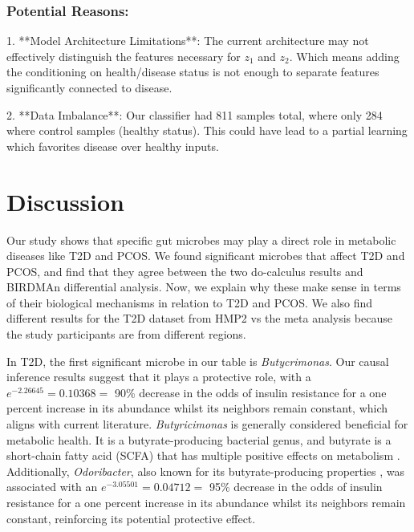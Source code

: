 \documentclass[12pt,letterpaper]{article}
\begin{document}
\subsubsection{Potential Reasons:}

1. **Model Architecture Limitations**: The current architecture may not effectively distinguish the features necessary for \( z_1 \) and \( z_2 \). Which means adding the conditioning on health/disease status is not enough to separate features significantly connected to disease.

2. **Data Imbalance**: Our classifier had 811 samples total, where only 284 where control samples (healthy status). This could have lead to a partial learning which favorites disease over healthy inputs.


\section{Discussion}

Our study shows that specific gut microbes may play a direct role in metabolic diseases like T2D and PCOS. We found significant microbes that affect T2D and PCOS, and find that they agree between the two do-calculus results and BIRDMAn differential analysis. Now, we explain why these make sense in terms of their biological mechanisms in relation to T2D and PCOS. We also find different results for the T2D dataset from HMP2 vs the meta analysis because the study participants are from different regions. 

In T2D, the first significant microbe in our table is \textit{Butycrimonas}. Our causal inference results suggest that it plays a protective role, with a $e^{-2.26645} = 0.10368 =$ 90\% decrease in the odds of insulin resistance for a one percent increase in its abundance whilst its neighbors remain constant, which aligns with current literature. \textit{Butyricimonas} is generally considered beneficial for metabolic health. It is a butyrate-producing bacterial genus, and butyrate is a short-chain fatty acid (SCFA) that has multiple positive effects on metabolism \citep{lee2022butyricimonas}. Additionally, \textit{Odoribacter}, also known for its butyrate-producing properties \citep{albataineh2023odoribacter}, was associated with an $e^{-3.05501} = 0.04712 =$ 95\% decrease in the odds of insulin resistance for a one percent increase in its abundance whilst its neighbors remain constant, reinforcing its potential protective effect.
\end{document}
